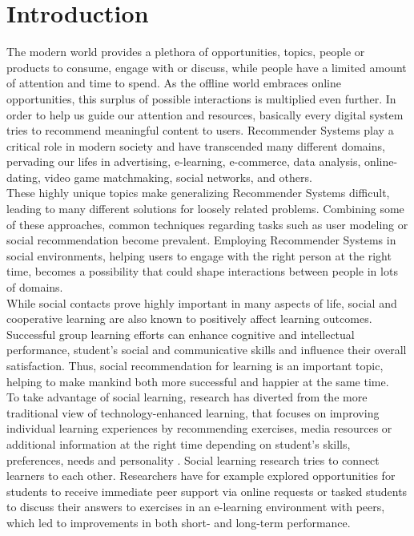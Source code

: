 \documentclass[conference]{IEEEtran}
\begin{document}
\section{Introduction}
The modern world provides a plethora of opportunities, topics, people or products to consume, engage with or discuss, while people have a limited amount of attention and time to spend. As the offline world embraces online opportunities, this surplus of possible interactions is multiplied even further. In order to help us guide our attention and resources, basically every digital system tries to recommend meaningful content to users. Recommender Systems play a critical role in modern society and have transcended many different domains, pervading our lifes in advertising, e-learning, e-commerce, data analysis, online-dating, video game matchmaking, social networks, and others.\\
These highly unique topics make generalizing Recommender Systems difficult, leading to many different solutions for loosely related problems. \cite{BUDER2012207} Combining some of these approaches, common techniques regarding tasks such as user modeling or social recommendation become prevalent. Employing Recommender Systems in social environments, helping users to engage with the right person at the right time, becomes a possibility that could shape interactions between people in lots of domains.\\ 
While social contacts prove highly important in many aspects of life, social and cooperative learning are also known to positively affect learning outcomes. \cite{bossert1982instructional, blumenfeld1996learning} Successful group learning efforts can enhance cognitive and intellectual performance, student's social and communicative skills and influence their overall satisfaction. \cite{zhao2004adding, maxwell2008learning} Thus, social recommendation for learning is an important topic, helping to make mankind both more successful and happier at the same time.\\
To take advantage of social learning, research has diverted from the more traditional view of technology-enhanced learning, that focuses on improving individual learning experiences by recommending exercises, media resources or additional information at the right time depending on student's skills, preferences, needs and personality \cite{drachsler2015panorama, erdt2015evaluating}. Social learning research tries to connect learners to each other. Researchers have for example explored opportunities for students to receive immediate peer support via online requests \cite{greer1998intelligent} or tasked students to discuss their answers to exercises in an e-learning environment with peers, which led to improvements in both short- and long-term performance. \cite{reidsema2016exploring}\\
\end{document}
